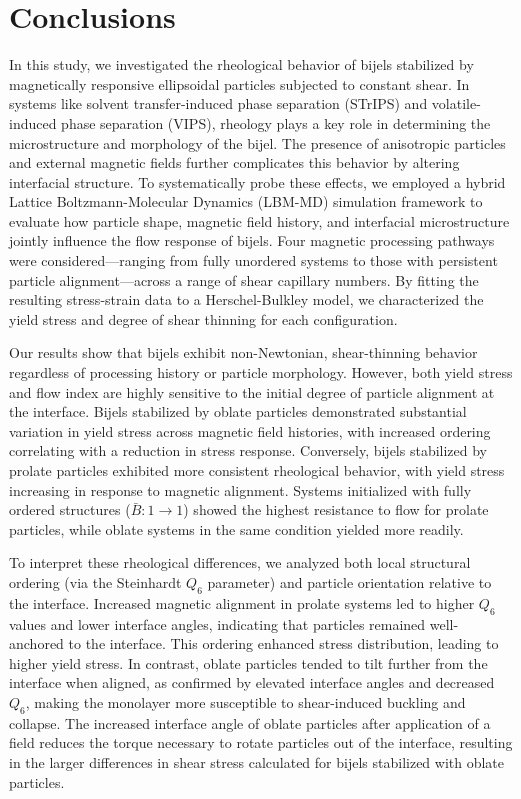 \section{Conclusions}

In this study, we investigated the rheological behavior of bijels stabilized by magnetically responsive ellipsoidal particles subjected to constant shear. 
In systems like solvent transfer-induced phase separation (STrIPS) and volatile-induced phase separation (VIPS), rheology plays a key role in determining the
microstructure and morphology of the bijel. The presence of anisotropic particles and external magnetic fields further complicates this behavior 
by altering interfacial structure. To systematically probe these effects, we employed a hybrid Lattice Boltzmann-Molecular Dynamics (LBM-MD) simulation 
framework to evaluate how particle shape, magnetic field history, and interfacial microstructure jointly influence the flow response of bijels. 
Four magnetic processing pathways were considered—ranging from fully unordered systems to those with persistent particle alignment—across a range of 
shear capillary numbers. By fitting the resulting stress-strain data to a Herschel-Bulkley model, we characterized the yield stress and degree of shear 
thinning for each configuration.

Our results show that bijels exhibit non-Newtonian, shear-thinning behavior regardless of processing history or particle morphology. However, both yield stress 
and flow index are highly sensitive to the initial degree of particle alignment at the interface. Bijels stabilized by oblate particles demonstrated substantial 
variation in yield stress across magnetic field histories, with increased ordering correlating with a reduction in stress response. Conversely, bijels stabilized 
by prolate particles exhibited more consistent rheological behavior, with yield stress increasing in response to magnetic alignment. Systems initialized with 
fully ordered structures ($\bar{B}:1 \rightarrow 1$) showed the highest resistance to flow for prolate particles, while oblate systems in the same condition 
yielded more readily.

To interpret these rheological differences, we analyzed both local structural ordering (via the Steinhardt $Q_6$ parameter) and particle orientation relative to 
the interface. Increased magnetic alignment in prolate systems led to higher $Q_6$ values and lower interface angles, indicating that particles remained 
well-anchored to the interface. This ordering enhanced stress distribution, leading to higher yield stress. In contrast, oblate particles 
tended to tilt further from the interface when aligned, as confirmed by elevated interface angles and decreased $Q_6$, making the monolayer more susceptible to 
shear-induced buckling and collapse. The increased interface angle of oblate particles after application of a field reduces the torque necessary to rotate particles
out of the interface, resulting in the larger differences in shear stress calculated for bijels stabilized with oblate particles.

